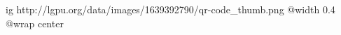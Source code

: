  
 
 
 
 

\ifcmt
  ig http://lgpu.org/data/images/1639392790/qr-code_thumb.png
  @width 0.4
	@wrap center
\fi
